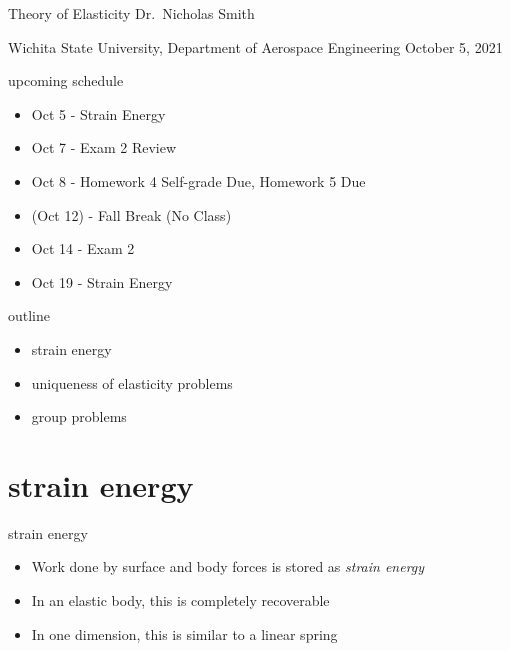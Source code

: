 \documentclass[
  letterpaper,
  ignorenonframetext,
  aspectratio=43,
  handout,
  12pt]{beamer}
\author{}
\date{}
\providecommand{\tightlist}{%
  \setlength{\itemsep}{0pt}\setlength{\parskip}{0pt}}
\providecommand{\tightlist}{%
\setlength{\itemsep}{0pt}\setlength{\parskip}{0pt}}
\begin{document}
\begin{frame}{Theory of Elasticity}
\protect\hypertarget{theory-of-elasticity}{}
Dr.~Nicholas Smith

Wichita State University, Department of Aerospace Engineering October 5,
2021
\end{frame}

\begin{frame}{upcoming schedule}
\protect\hypertarget{upcoming-schedule}{}
\begin{itemize}
\tightlist
\item
  Oct 5 - Strain Energy
\item
  Oct 7 - Exam 2 Review
\item
  Oct 8 - Homework 4 Self-grade Due, Homework 5 Due
\item
  (Oct 12) - Fall Break (No Class)
\item
  Oct 14 - Exam 2
\item
  Oct 19 - Strain Energy
\end{itemize}
\end{frame}

\begin{frame}{outline}
\protect\hypertarget{outline}{}
\begin{itemize}
\tightlist
\item
  strain energy
\item
  uniqueness of elasticity problems
\item
  group problems
\end{itemize}
\end{frame}

\hypertarget{strain-energy}{%
\section{strain energy}\label{strain-energy}}

\begin{frame}{strain energy}
\protect\hypertarget{strain-energy-1}{}
\begin{itemize}
\tightlist
\item
  Work done by surface and body forces is stored as \emph{strain energy}
\item
  In an elastic body, this is completely recoverable
\item
  In one dimension, this is similar to a linear spring
\end{itemize}
\end{frame}
\end{document}
